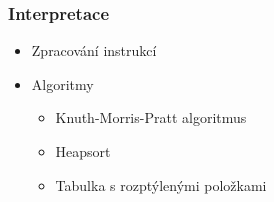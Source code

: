 \documentclass[pdf]{beamer}
\begin{document}

\begin{frame}
    \frametitle{Interpretace}
	\LARGE
	\begin{itemize}
		\item Zpracování instrukcí
		\item Algoritmy
		\begin{itemize}
			\item Knuth-Morris-Pratt algoritmus
			\item Heapsort
			\item Tabulka s rozptýlenými položkami
		\end{itemize}
	\end{itemize}
\end{frame}

\end{document}
